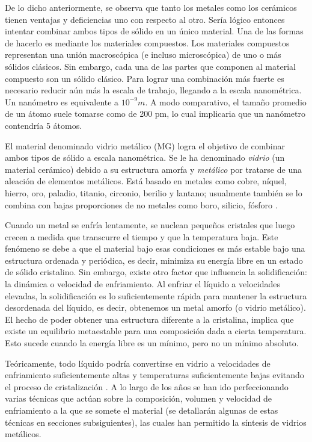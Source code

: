 De lo dicho anteriormente, se observa que tanto los metales como los cerámicos tienen ventajas y deficiencias uno con respecto al otro. Sería lógico entonces intentar combinar ambos tipos de sólido en un único material. Una de las formas de hacerlo es mediante los materiales compuestos. Los materiales compuestos representan una unión macroscópica (e incluso microscópica) de uno o más sólidos clásicos. Sin embargo, cada una de las partes que componen al material compuesto son un sólido clásico. Para lograr una combinación más fuerte es necesario reducir aún más la escala de trabajo, llegando a la escala nanométrica. Un nanómetro es equivalente a $10^{-9} m$. A modo comparativo, el tamaño promedio de un átomo suele tomarse como de 200 pm, lo cual implicaria que un nanómetro contendría 5 átomos.

El material denominado vidrio metálico (MG) logra el objetivo de combinar ambos tipos de sólido a escala nanométrica. Se le ha denominado \textit{vidrio} (un material cerámico) debido a su estructura amorfa y \textit{metálico} por tratarse de una aleación de elementos metálicos. Está basado en metales como cobre, níquel, hierro, oro, paladio, titanio, circonio, berilio y lantano; usualmente también se lo combina con bajas proporciones de no metales como boro, silicio, fósforo \citep{andrievski13}.

Cuando un metal se enfría lentamente, se nuclean pequeños cristales que luego crecen a medida que transcurre el tiempo y que la temperatura baja. Este fenómeno se debe a que el material bajo esas condiciones es más estable bajo una estructura ordenada y periódica, es decir, minimiza su energía libre en un estado de sólido cristalino. Sin embargo, existe otro factor que influencia la solidificación: la dinámica o velocidad de enfriamiento. Al enfriar el líquido a velocidades elevadas, la solidificación es lo suficientemente rápida para mantener la estructura desordenada del líquido, es decir, obtenemos un metal amorfo (o vidrio metálico). El hecho de poder obtener una estructura diferente a la cristalina, implica que existe un equilibrio metaestable para una composición dada a cierta temperatura. Esto sucede cuando la energía libre es un mínimo, pero no un mínimo absoluto.

Teóricamente, todo líquido podría convertirse en vidrio a velocidades de enfriamiento suficientemente altas y temperaturas suficientemente bajas evitando el proceso de cristalización \citep{turnbull61}. A lo largo de los años se han ido perfeccionando varias técnicas que actúan sobre la composición, volumen y velocidad de enfriamiento a la que se somete el material (se detallarán algunas de estas técnicas en secciones subsiguientes), las cuales han permitido la síntesis de vidrios metálicos.

